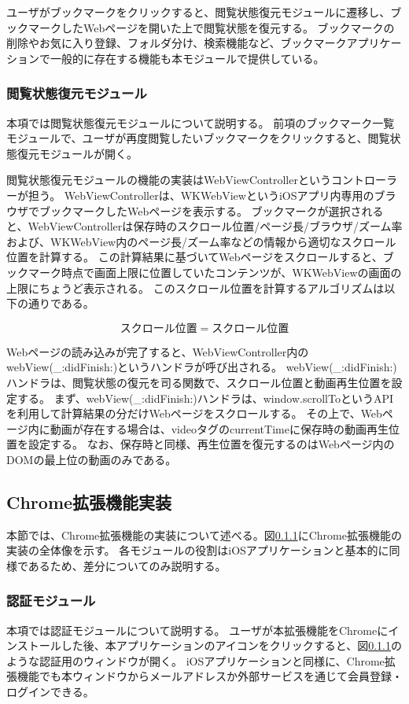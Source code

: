 ユーザがブックマークをクリックすると、閲覧状態復元モジュールに遷移し、ブックマークしたWebページを開いた上で閲覧状態を復元する。
ブックマークの削除やお気に入り登録、フォルダ分け、検索機能など、ブックマークアプリケーションで一般的に存在する機能も本モジュールで提供している。

\subsubsection{閲覧状態復元モジュール}
本項では閲覧状態復元モジュールについて説明する。
前項のブックマーク一覧モジュールで、ユーザが再度閲覧したいブックマークをクリックすると、閲覧状態復元モジュールが開く。

閲覧状態復元モジュールの機能の実装はWebViewControllerというコントローラーが担う。
WebViewControllerは、WKWebViewというiOSアプリ内専用のブラウザでブックマークしたWebページを表示する。
ブックマークが選択されると、WebViewControllerは保存時のスクロール位置/ページ長/ブラウザ/ズーム率および、WKWebView内のページ長/ズーム率などの情報から適切なスクロール位置を計算する。
この計算結果に基づいてWebページをスクロールすると、ブックマーク時点で画面上限に位置していたコンテンツが、WKWebViewの画面の上限にちょうど表示される。
このスクロール位置を計算するアルゴリズムは以下の通りである。

\begin{equation}
スクロール位置 = スクロール位置
\end{equation}

Webページの読み込みが完了すると、WebViewController内のwebView(\_:didFinish:)\cite{didFinish}というハンドラが呼び出される。
webView(\_:didFinish:)ハンドラは、閲覧状態の復元を司る関数で、スクロール位置と動画再生位置を設定する。
まず、webView(\_:didFinish:)ハンドラは、window.scrollToというAPIを利用して計算結果の分だけWebページをスクロールする。
その上で、Webページ内に動画が存在する場合は、videoタグのcurrentTimeに保存時の動画再生位置を設定する。
なお、保存時と同様、再生位置を復元するのはWebページ内のDOMの最上位の動画のみである。


\subsection{Chrome拡張機能実装}
本節では、Chrome拡張機能の実装について述べる。図\ref{}にChrome拡張機能の実装の全体像を示す。
各モジュールの役割はiOSアプリケーションと基本的に同様であるため、差分についてのみ説明する。

\subsubsection{認証モジュール}
本項では認証モジュールについて説明する。
ユーザが本拡張機能をChromeにインストールした後、本アプリケーションのアイコンをクリックすると、図\ref{}のような認証用のウィンドウが開く。
iOSアプリケーションと同様に、Chrome拡張機能でも本ウィンドウからメールアドレスか外部サービスを通じて会員登録・ログインできる。

